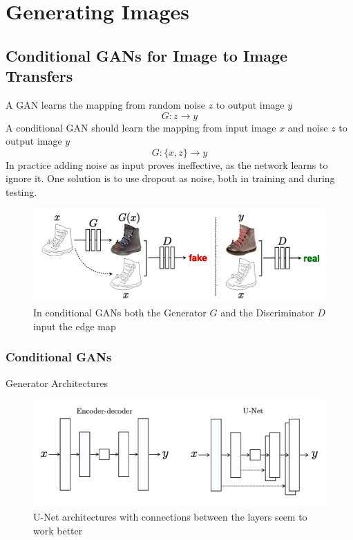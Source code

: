 \section{Generating Images}

\subsection{Conditional GANs for Image to Image Transfers}
A GAN learns the mapping from random noise $z$ to output image $y$
\begin{equation*}
	G: z \rightarrow y
\end{equation*}
A conditional GAN should learn the mapping from input image $x$ and noise $z$ to output image $y$
\begin{equation*}
	G: \{x,z\} \rightarrow y
\end{equation*}
In practice adding noise as input proves ineffective, as the network learns to ignore it. One solution is to use dropout as noise, both in training and during testing.
\begin{figure}[H]
	\centering
	\includegraphics[width=0.7\linewidth]{img/conditional_GAN_edge_map}
	\caption{In conditional GANs both the Generator $G$ and the Discriminator $D$ input the edge map}
	\label{fig:conditionalganedgemap}
\end{figure}

\subsubsection{Conditional GANs}
Generator Architectures
\begin{figure}[H]
	\centering
	\includegraphics[width=0.7\linewidth]{img/conditional_GAN_generator_architectures}
	\caption{U-Net architectures with connections between the layers seem to work better}
	\label{fig:conditionalgangeneratorarchitectures}
\end{figure}

